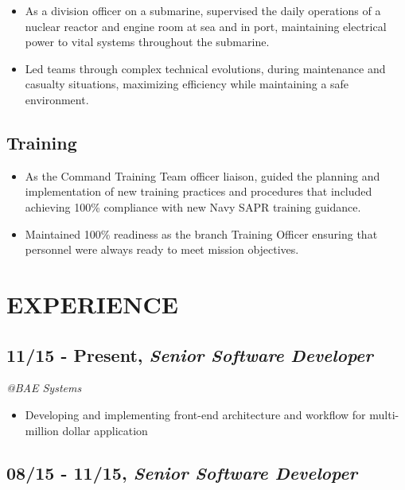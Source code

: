 \documentclass[10pt]{article}
\begin{document}
\begin{itemize}
\itemsep1pt\parskip0pt
\item
  As a division officer on a submarine, supervised the daily operations
  of a nuclear reactor and engine room at sea and in port, maintaining
  electrical power to vital systems throughout the submarine.
\item
  Led teams through complex technical evolutions, during maintenance and
  casualty situations, maximizing efficiency while maintaining a safe
  environment.
\end{itemize}

\subsection{Training}\label{training}

\begin{itemize}
\itemsep1pt\parskip0pt
\item
  As the Command Training Team officer liaison, guided the planning and
  implementation of new training practices and procedures that included
  achieving 100\% compliance with new Navy SAPR training guidance.
\item
  Maintained 100\% readiness as the branch Training Officer ensuring
  that personnel were always ready to meet mission objectives.
\end{itemize}

\section{EXPERIENCE}\label{experience}

\subsection{11/15 - Present, \textbf{\emph{Senior Software
Developer}}}\label{present-senior-software-developer}

\emph{@BAE Systems }

\begin{itemize}
\itemsep1pt\parskip0pt
\item
  Developing and implementing front-end architecture and workflow for
  multi-million dollar application
\end{itemize}

\subsection{08/15 - 11/15, \textbf{\emph{Senior Software
Developer}}}\label{senior-software-developer}
\end{document}
